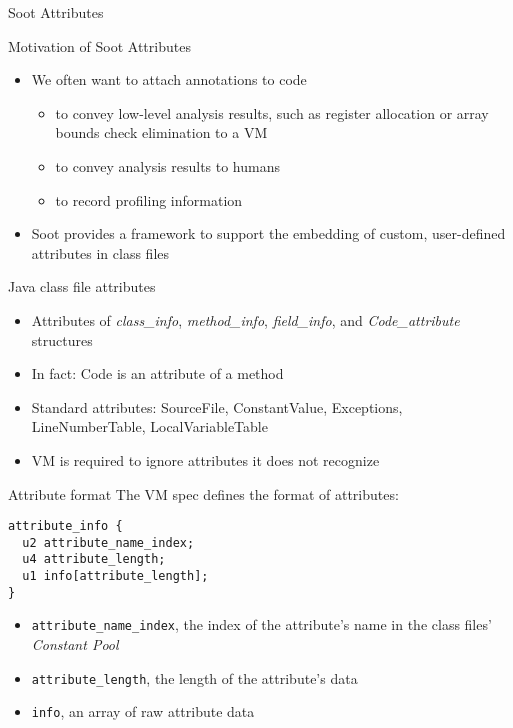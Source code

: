 \begin{slide}{Soot Attributes}
\end{slide}

\begin{slide}{Motivation of Soot Attributes}
\begin{itemize}
\item We often want to attach annotations to code
\begin{itemize}
\item to convey low-level analysis results, such as register allocation or
      array bounds check elimination to a VM
\item to convey analysis results to humans
\item to record profiling information
\end{itemize}
\item Soot provides a framework to support the embedding of custom, 
      user-defined attributes in class files
\end{itemize}
\end{slide}

\begin{slide}{Java class file attributes}
\begin{itemize}
\item Attributes of {\em class\_info}, {\em method\_info}, 
      {\em field\_info}, and {\em Code\_attribute} structures
\item In fact: Code is an attribute of a method
\item Standard attributes: SourceFile, ConstantValue, Exceptions,
      LineNumberTable, LocalVariableTable
\item VM is required to ignore attributes it does not recognize
\end{itemize}
\end{slide}

\begin{slide}{Attribute format}
The VM spec defines the format of attributes:
\small{
\begin{verbatim}
attribute_info {
  u2 attribute_name_index;
  u4 attribute_length;
  u1 info[attribute_length];
}
\end{verbatim}
}
\begin{itemize}
\item {\tt attribute\_name\_index}, the index of the attribute's name in the class files' {\em Constant Pool}
\item {\tt attribute\_length}, the length of the attribute's data
\item {\tt info}, an array of raw attribute data
\end{itemize}
\end{slide}


